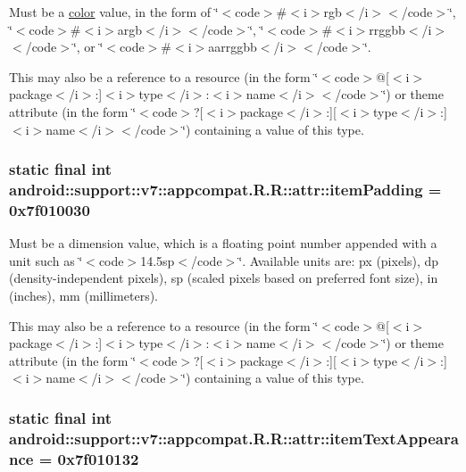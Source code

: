 Must be a \hyperlink{classandroid_1_1support_1_1v7_1_1appcompat_1_1_r_1_1color}{color} value, in the form of \char`\"{}$<$code$>$\#$<$i$>$rgb$<$/i$>$$<$/code$>$\char`\"{}, \char`\"{}$<$code$>$\#$<$i$>$argb$<$/i$>$$<$/code$>$\char`\"{}, \char`\"{}$<$code$>$\#$<$i$>$rrggbb$<$/i$>$$<$/code$>$\char`\"{}, or \char`\"{}$<$code$>$\#$<$i$>$aarrggbb$<$/i$>$$<$/code$>$\char`\"{}. 

This may also be a reference to a resource (in the form \char`\"{}$<$code$>$@\mbox{[}$<$i$>$package$<$/i$>$:\mbox{]}$<$i$>$type$<$/i$>$:$<$i$>$name$<$/i$>$$<$/code$>$\char`\"{}) or theme attribute (in the form \char`\"{}$<$code$>$?\mbox{[}$<$i$>$package$<$/i$>$:\mbox{]}\mbox{[}$<$i$>$type$<$/i$>$:\mbox{]}$<$i$>$name$<$/i$>$$<$/code$>$\char`\"{}) containing a value of this type. \hypertarget{classandroid_1_1support_1_1v7_1_1appcompat_1_1_r_1_1attr_932d94354899995f8e19447a584c8c06}{
\subsubsection[{itemPadding}]{\setlength{\rightskip}{0pt plus 5cm}static final int android::support::v7::appcompat.R.R::attr::itemPadding = 0x7f010030}}
\label{classandroid_1_1support_1_1v7_1_1appcompat_1_1_r_1_1attr_932d94354899995f8e19447a584c8c06}


Must be a dimension value, which is a floating point number appended with a unit such as \char`\"{}$<$code$>$14.5sp$<$/code$>$\char`\"{}. Available units are: px (pixels), dp (density-independent pixels), sp (scaled pixels based on preferred font size), in (inches), mm (millimeters). 

This may also be a reference to a resource (in the form \char`\"{}$<$code$>$@\mbox{[}$<$i$>$package$<$/i$>$:\mbox{]}$<$i$>$type$<$/i$>$:$<$i$>$name$<$/i$>$$<$/code$>$\char`\"{}) or theme attribute (in the form \char`\"{}$<$code$>$?\mbox{[}$<$i$>$package$<$/i$>$:\mbox{]}\mbox{[}$<$i$>$type$<$/i$>$:\mbox{]}$<$i$>$name$<$/i$>$$<$/code$>$\char`\"{}) containing a value of this type. \hypertarget{classandroid_1_1support_1_1v7_1_1appcompat_1_1_r_1_1attr_d692b8c63d24555f86b0f331618e7d38}{
\subsubsection[{itemTextAppearance}]{\setlength{\rightskip}{0pt plus 5cm}static final int android::support::v7::appcompat.R.R::attr::itemTextAppearance = 0x7f010132}}
\label{classandroid_1_1support_1_1v7_1_1appcompat_1_1_r_1_1attr_d692b8c63d24555f86b0f331618e7d38}


